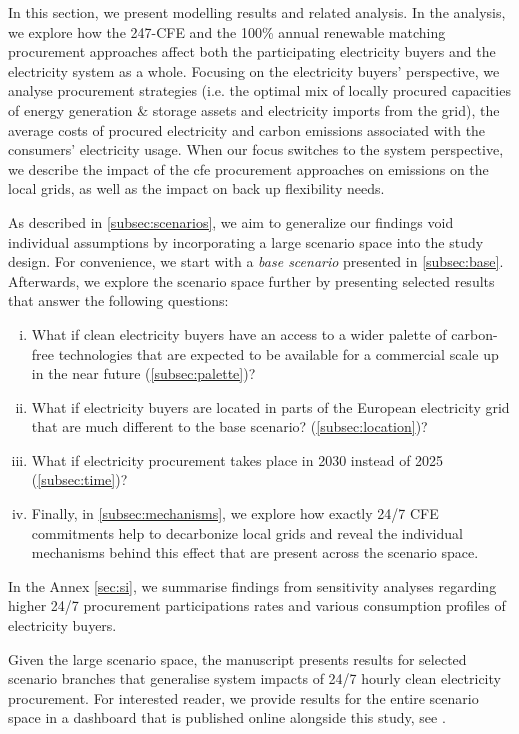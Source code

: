 In this section, we present modelling results and related analysis. 
In the analysis, we explore how the 247-CFE and the 100\% annual renewable matching procurement approaches affect both the participating electricity buyers and the electricity system as a whole. 
Focusing on the electricity buyers' perspective, we analyse procurement strategies (i.e. the optimal mix of locally procured capacities of energy generation \& storage assets and electricity imports from the grid), the average costs of procured electricity and carbon emissions associated with the consumers' electricity usage.
When our focus switches to the system perspective, we describe the impact of the \gls{cfe} procurement approaches on \co emissions on the local grids, as well as the impact on back up flexibility needs.

As described in \cref{subsec:scenarios}, we aim to generalize our findings void individual assumptions by incorporating a large scenario space into the study design. 
For convenience, we start with a \textit{base scenario} presented in \cref{subsec:base}.
Afterwards, we explore the scenario space further by presenting selected results that answer the following questions:
\begin{enumerate}[(i)]
\item What if clean electricity buyers have an access to a wider palette of carbon-free technologies that are expected to be available for a commercial scale up in the near future (\cref{subsec:palette})?
\item What if electricity buyers are located in parts of the European electricity grid that are much different to the base scenario? (\cref{subsec:location})?
\item What if electricity procurement takes place in 2030 instead of 2025 (\cref{subsec:time})? 
\item Finally, in \cref{subsec:mechanisms}, we explore how exactly 24/7 CFE commitments help to decarbonize local grids and reveal the individual mechanisms behind this effect that are present across the scenario space.
\end{enumerate}

In the Annex \ref{sec:si}, we summarise findings from sensitivity analyses regarding higher 24/7 procurement participations rates and various consumption profiles of electricity buyers.

Given the large scenario space, the manuscript presents results for selected scenario branches that generalise system impacts of 24/7 hourly clean electricity procurement.
For interested reader, we provide results for the entire scenario space in a dashboard that is published online alongside this study, see .


